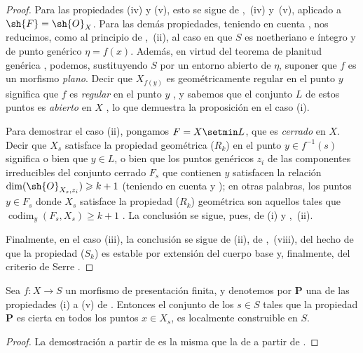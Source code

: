 \begin{proof}
\label{IV.9.9.4-proof}
Para las propiedades (iv) y (v), esto se sigue de ,~(iv) y~(v), aplicado a $\sh{F}=\sh{O}_X$.
Para las demás propiedades, teniendo en cuenta , nos reducimos, como al principio de ,~(ii), al caso en que $S$ es noetheriano e íntegro y de punto genérico $\eta=f(x)$.
Además, en virtud del teorema de planitud genérica , podemos, sustituyendo $S$ por un entorno abierto de $\eta$, suponer que $f$ es un morfismo \emph{plano}.
Decir que $X_{f(y)}$ es geométricamente regular en el punto $y$ significa que $f$ es \emph{regular} en el punto $y$ , y sabemos que el conjunto $L$ de estos puntos es \emph{abierto} en $X$ , lo que demuestra la proposición en el caso (i).

Para demostrar el caso (ii), pongamos $F=X\setmin L$, que es \emph{cerrado} en $X$.
Decir que $X_s$
satisface la propiedad geométrica ($R_k$) en el punto $y\in f^{-1}(s)$ significa o bien que $y\in L$, o bien que los puntos genéricos $z_i$ de las componentes irreducibles del conjunto cerrado $F_s$ que contienen $y$ satisfacen la relación $\dim(\sh{O}_{X_s,z_i})\geqslant k+1$ (teniendo en cuenta  y ); en otras palabras, los puntos $y\in F_s$ donde $X_s$ satisface la propiedad ($R_k$) geométrica son aquellos tales que $\operatorname{codim}_y(F_s,X_s)\geqslant k+1$ .
La conclusión se sigue, pues, de (i) y ,~(ii).

Finalmente, en el caso (iii), la conclusión se sigue de (ii), de ,~(viii), del hecho de que la propiedad ($S_k$) es estable por extensión del cuerpo base  y, finalmente, del criterio de Serre .
\end{proof}

\begin{corollary}[9.9.5]
\label{IV.9.9.5}
Sea $f:X\to S$ un morfismo de presentación finita, y denotemos por $\boldsymbol{P}$ una de las propiedades \textup{(i)} a \textup{(v)} de .
Entonces el conjunto de los $s\in S$ tales que la propiedad $\boldsymbol{P}$ es cierta en todos los puntos $x\in X_s$, es localmente construible en $S$.
\end{corollary}

\begin{proof}
\label{IV.9.9.5-proof}
La demostración a partir de  es la misma que la de  a partir de .
\end{proof}

